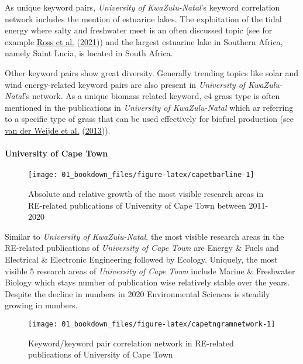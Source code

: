 \documentclass[12pt,twoside]{report}
\let\oldparagraph\paragraph
\renewcommand{\paragraph}[1]{\oldparagraph{#1}\mbox{}}
\begin{document}
As unique keyword pairs, \emph{University of KwaZulu-Natal}'s keyword correlation network includes the mention of estuarine lakes. The exploitation of the tidal energy where salty and freshwater meet is an often discussed topic (see for example \protect\hyperlink{ref-ross2021}{Ross et al.} (\protect\hyperlink{ref-ross2021}{2021})) and the largest estuarine lake in Southern Africa, namely Saint Lucia, is located in South Africa.

Other keyword pairs show great diversity. Generally trending topics like solar and wind energy-related keyword pairs are also present in \emph{University of KwaZulu-Natal}'s network. As a unique biomass related keyword, c4 grass type is often mentioned in the publications in \emph{University of KwaZulu-Natal} which ar referring to a specific type of grass that can be used effectively for biofuel production (see \protect\hyperlink{ref-vanderweijde2013}{van der Weijde et al.} (\protect\hyperlink{ref-vanderweijde2013}{2013})).

\hypertarget{university-of-cape-town}{%
\paragraph{University of Cape Town}\label{university-of-cape-town}}

\begin{figure}
\texttt{[image: 01\_bookdown\_files/figure-latex/capetbarline-1]} \caption{Absolute and relative growth of the most visible research areas in RE-related publications of University of Cape Town between 2011-2020}\label{fig:capetbarline}
\end{figure}

Similar to \emph{University of KwaZulu-Natal}, the most visible research areas in the RE-related publications of \emph{University of Cape Town} are Energy \& Fuels and Electrical \& Electronic Engineering followed by Ecology. Uniquely, the most visible 5 research areas of \emph{University of Cape Town} include Marine \& Freshwater Biology which stays number of publication wise relatively stable over the years. Despite the decline in numbers in 2020 Environmental Sciences is steadily growing in numbers.

\begin{figure}
\texttt{[image: 01\_bookdown\_files/figure-latex/capetngramnetwork-1]} \caption{Keyword/keyword pair correlation network in RE-related publications of University of Cape Town}\label{fig:capetngramnetwork}
\end{figure}
\end{document}
